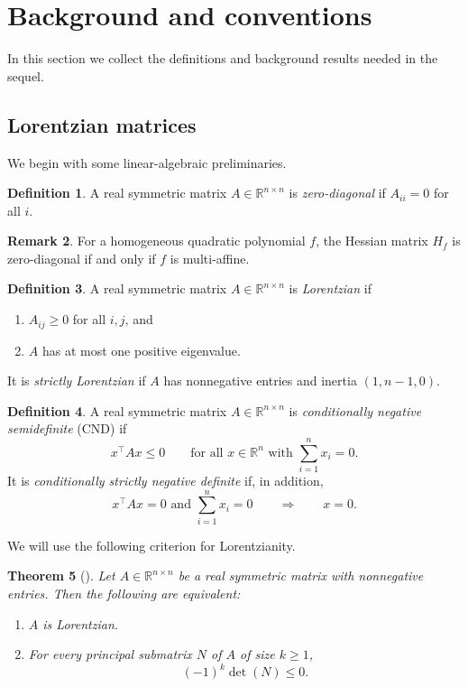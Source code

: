 \documentclass[12pt]{amsart}
\newtheorem{theorem}{Theorem}[section]
\theoremstyle{definition}
\newtheorem{definition}[theorem]{Definition}
\newtheorem{remark}[theorem]{Remark}
\newcommand{\1}{\mathbf{1}}
\newcommand\R{{\mathbb R}}
\begin{document}
\section{Background and conventions}

In this section we collect the definitions and background results needed in the sequel.

\subsection{Lorentzian matrices}

We begin with some linear-algebraic preliminaries.

\begin{definition}
A real symmetric matrix $A\in \R^{n\times n}$ is \emph{zero-diagonal} if $A_{ii}=0$
for all $i$. 
\end{definition}

\begin{remark}
For a homogeneous quadratic polynomial $f$, the Hessian matrix $H_f$ is zero-diagonal
if and only if $f$ is multi-affine.
\end{remark}

\begin{definition}
A real symmetric matrix $A\in \R^{n\times n}$ is \emph{Lorentzian} if
\begin{enumerate}
\item $A_{ij}\ge 0$ for all $i,j$, and
\item $A$ has at most one positive eigenvalue.
\end{enumerate}
It is \emph{strictly Lorentzian} if $A$ has nonnegative entries and inertia
$(1,n-1,0)$.
\end{definition}

\begin{definition}
A real symmetric matrix $A\in \R^{n\times n}$ is \emph{conditionally negative
semidefinite} (CND) if
\[
x^\top A x \le 0
\qquad\text{for all }x\in \R^n \text{ with } \sum_{i=1}^n x_i = 0.
\]
It is \emph{conditionally strictly negative definite} if, in addition,
\[
x^\top A x = 0 \text{ and } \sum_{i=1}^n x_i=0
\qquad\Longrightarrow\qquad
x=0.
\]
\end{definition}

We will use the following criterion for Lorentzianity.

\begin{theorem}[{\cite[Lemma 2.2]{RSW}}]
\label{thm:principal-minor-criterion}
Let $A\in \R^{n\times n}$ be a real symmetric matrix with nonnegative entries. Then the
following are equivalent:
\begin{enumerate}
\item $A$ is Lorentzian.
\item For every principal submatrix $N$ of $A$ of size $k\ge 1$,
\[
(-1)^k \det(N)\le 0.
\]
\end{enumerate}
\end{theorem}
\end{document}
